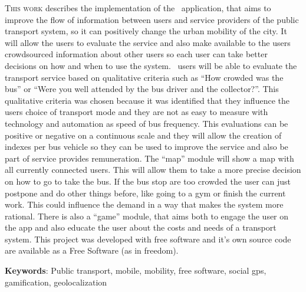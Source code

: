 \lettrine{T}{his work} describes the implementation of the \trilhasp~application, that aims to improve the flow of information between users and service providers of the public transport system, so it can positively change the urban mobility of the city. It will allow the users to evaluate the service and also make available to the users crowdsourced information about other users so each user can take better decisions on how and when to use the system.%
%
\trilhasp~users will be able to evaluate the transport service based on qualitative criteria such as ``How crowded was the bus'' or ``Were you well attended by the bus driver and the collector?''. This qualitative criteria was chosen because it was identified that they influence the users choice of transport mode and they are not as easy to measure with technology and automation as speed of bus frequency. This evaluations can be positive or negative on a continuous scale and they will allow the creation of indexes per bus vehicle so they can be used to improve the service and also be part of service provides remuneration.%
%
The ``map'' module will show a map with all currently connected users. This will allow them to take a more precise decision on how to go to take the bus. If the bus stop are too crowded the user can just postpone and do other things before, like going to a gym or finish the current work. This could influence the demand in a way that makes the system more rational.%
%
There is also a ``game'' module, that aims both to engage the user on the app and also educate the user about the costs and needs of a transport system.%
%
This project was developed with free software and it's own source code are available as a Free Software (as in freedom).

\vspace{\onelineskip}

\vfill

\noindent 

\textbf{Keywords}: Public transport, mobile, mobility, free software, social gps, gamification, geolocalization